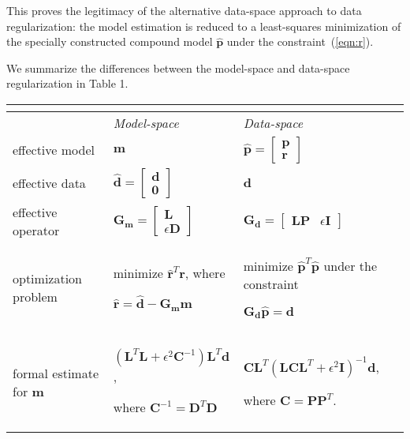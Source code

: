 This proves the legitimacy
of the alternative data-space approach to data regularization: the
model estimation is reduced to a least-squares minimization of the
specially constructed compound model $\hat{\mathbf{p}}$ under the
constraint~(\ref{eqn:r}).

We summarize the differences between the model-space and data-space
regularization in Table 1.

{\centering
\begin{tabular}{|l||p{2in}|p{2in}|} \hline
  \multicolumn{3}{c}{\rule[-3mm]{0mm}{8mm}} \\
  \hline \rule[-3mm]{0mm}{8mm} 
  & \emph{Model-space} & \emph{Data-space} \\ \hline \hline
  \rule[-8mm]{0mm}{17mm} effective model & $\mathbf{m}$ & $\hat{\mathbf{p}} =
  \left[\begin{array}{c} \mathbf{p} \\ \mathbf{r} \end{array}\right]$ \\ \hline
  \rule[-8mm]{0mm}{17mm} effective data & $\hat{\mathbf{d}} =
  \left[\begin{array}{c} \mathbf{d} \\ \mathbf{0}
    \end{array}\right]$ & $\mathbf{d}$ \\ \hline \rule[-8mm]{0mm}{17mm}
  effective operator & $\mathbf{G_m} = \left[\begin{array}{c} \mathbf{L} \\
      \epsilon \mathbf{D} \end{array}\right]$ & $\mathbf{G_d} =
  \left[\begin{array}{cc} \mathbf{LP} & \epsilon \mathbf{I} \end{array}\right]$ \\
  \hline \rule[-3mm]{0mm}{8mm} optimization problem & minimize
  $\hat{\mathbf{r}}^T \hat{\mathbf{r}}$, \newline where \newline
  \rule[-3mm]{0mm}{8mm} $\hat{\mathbf{r}} = \hat{\mathbf{d}} - \mathbf{G_m m}$ & 
  minimize
  $\hat{\mathbf{p}}^T \hat{\mathbf{p}}$ \newline under the constraint
  \newline \rule[-3mm]{0mm}{8mm} $\mathbf{G_d} \hat{\mathbf{p}} = \mathbf{d}$ \\
  \hline \rule[-5mm]{0mm}{11mm} formal estimate for $\mathbf{m}$ &
  $\left(\mathbf{L}^T \mathbf{L} + 
    \epsilon^2 \mathbf{C}^{-1}\right) \mathbf{L}^T \mathbf{d}$, \newline
  \rule[-5mm]{0mm}{11mm} where $\mathbf{C}^{-1} = \mathbf{D}^T \mathbf{D}$ & 
  $\mathbf{C L}^T (\mathbf{L C L}^T
  + \epsilon^2 \mathbf{I})^{-1} \mathbf{d}$, 
  \newline \rule[-5mm]{0mm}{11mm} where $\mathbf{C}
  = \mathbf{P P}^T$. \\ \hline
\end{tabular}
}

